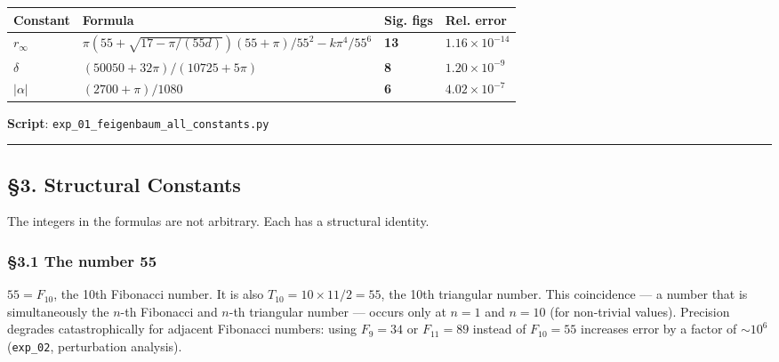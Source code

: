 \documentclass[
  11pt,
  a4paper]{article}
\begin{document}
\begin{longtable}[]{@{}
  >{\raggedright\arraybackslash}p{}
  >{\raggedright\arraybackslash}p{}
  >{\raggedright\arraybackslash}p{}
  >{\raggedright\arraybackslash}p{}@{}}
\toprule\noalign{}
\begin{minipage}[b]{\linewidth}\raggedright
Constant
\end{minipage} & \begin{minipage}[b]{\linewidth}\raggedright
Formula
\end{minipage} & \begin{minipage}[b]{\linewidth}\raggedright
Sig. figs
\end{minipage} & \begin{minipage}[b]{\linewidth}\raggedright
Rel. error
\end{minipage} \\
\midrule\noalign{}
\endhead
\bottomrule\noalign{}
\endlastfoot
\(r_\infty\) &
\(\pi(55 + \sqrt{17 - \pi/(55d)})(55 + \pi)/55^2 - k\pi^4/55^6\) &
\textbf{13} & \(1.16 \times 10^{-14}\) \\
\(\delta\) & \((50050 + 32\pi)/(10725 + 5\pi)\) & \textbf{8} &
\(1.20 \times 10^{-9}\) \\
\(|\alpha|\) & \((2700 + \pi)/1080\) & \textbf{6} &
\(4.02 \times 10^{-7}\) \\
\end{longtable}

\textbf{Script}: \texttt{exp\_01\_feigenbaum\_all\_constants.py}

\begin{center}\rule{0.5\linewidth}{0.5pt}\end{center}

\subsection{§3. Structural Constants}\label{structural-constants}

The integers in the formulas are not arbitrary. Each has a structural
identity.

\subsubsection{§3.1 The number 55}\label{the-number-55}

\(55 = F_{10}\), the 10th Fibonacci number. It is also
\(T_{10} = 10 \times 11/2 = 55\), the 10th triangular number. This
coincidence --- a number that is simultaneously the \(n\)-th Fibonacci
and \(n\)-th triangular number --- occurs only at \(n = 1\) and
\(n = 10\) (for non-trivial values). Precision degrades catastrophically
for adjacent Fibonacci numbers: using \(F_9 = 34\) or \(F_{11} = 89\)
instead of \(F_{10} = 55\) increases error by a factor of \(\sim10^6\)
(\texttt{exp\_02}, perturbation analysis).
\end{document}
